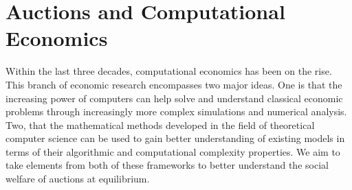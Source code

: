 \documentclass[12pt,twoside]{reedthesis}
\begin{document}
	
\chapter{Auctions and Computational Economics}
	Within the last three decades, computational economics has been on the rise. This branch of economic research encompasses two major ideas. One is that the increasing power of computers can help solve and understand classical economic problems through increasingly more complex simulations and numerical analysis. Two, that the mathematical methods developed in the field of theoretical computer science can be used to gain better understanding of existing models in terms of their algorithmic and computational complexity properties. We aim to take elements from both of these frameworks to better understand the social welfare of auctions at equilibrium. 
\end{document}
